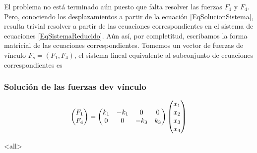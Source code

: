 
El problema no está terminado aún puesto que falta resolver las fuerzas $F_1$ y
$F_4$. Pero, conociendo los desplazamientos a partir de la ecuación
\ref{EqSolucionSistema}, resulta trivial resolver a partír de las ecuaciones
correspondientes en el sistema de ecuaciones \ref{EqSistemaReducido}. Aún así,
por completitud, escribamos la forma matricial de las ecuaciones
correspondientes. Tomemos un vector de fuerzas de vínculo $F_s = (F_1, F_4)$,
el sistema lineal equivalente al subconjunto de ecuaciones correspondientes es 

\mode*
\begin{frame}[label=FrameSolveForces]
  \frametitle<presentation>{Solución de las fuerzas dev vínculo}

    \begin{equation}\label{EqSolucionFuerzasVinc}
      \begin{pmatrix}F_1 \\ F_4 \end{pmatrix} 
	= 
	\begin{pmatrix} k_1  & -k_1 & 0 & 0 \\ 0 & 0 & -k_3 & k_3 \end{pmatrix} 
      \begin{pmatrix} x_1\\ x_2\\ x_3\\ x_4 \end{pmatrix}
    \end{equation}


\end{frame}

\mode<all>
